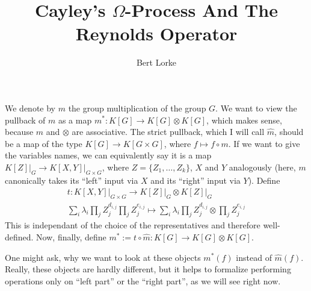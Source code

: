 \message{ !name(roughdraft.tex)}\documentclass{article}
\title{Cayley's $\Omega$-Process And The Reynolds Operator}
\author{Bert Lorke}
\theoremstyle{prrt}
\begin{document}
We denote by $m$ the group multiplication of the group $G$.
We want to view the pullback of $m$ as a map $m^\ast : K[G] \longrightarrow K[G] \otimes K[G]$, which makes sense, because $m$ and $\otimes$ are associative.
The strict pullback, which I will call $ \hat{m} $, should be a map of the type $ K[G] \longrightarrow K[ G \times G] $, where $ f \mapsto f \circ m $.
If we want to give the variables names, we can equivalently say it is a map $ \left. K[Z] \right|_G \longrightarrow \left. K[X,Y] \right|_{G \times G} $, where $ Z = \lbrace Z_1 , \ldots , Z_k \rbrace $, $X$ and $Y$ analogously (here, $ m $ canonically takes its ``left'' input via $ X $ and its ``right'' input via $ Y $). Define
\begin{equation}
  \begin{aligned}
   t : \left. K \left\lbrack X , Y \right\rbrack \right|_{G \times G} \longrightarrow \left. K \left\lbrack Z \right\rbrack \right|_G \otimes \left. K\left\lbrack Z \right\rbrack \right|_G \\
    \sum_i \lambda_i \prod_j Z_{j}^{d_{i,j}} \prod_j Z_{j}^{e_{i,j}} \mapsto \sum_i \lambda_i \prod_j Z_{j}^{d_{i,j}} \otimes \prod_j Z_{j}^{e_{i,j}} 
  \end{aligned}
\end{equation}
This is independant of the choice of the representatives and therefore well-defined.
Now, finally, define $m^\ast := t \circ \hat{m} : K[G] \longrightarrow K[G] \otimes K[G]$.

One might ask, why we want to look at these objects $ m^\ast \left( f \right) $ instead of $ \hat{m} \left( f \right) $.
Really, these objects are hardly different, but it helps to formalize performing operations only on ``left part'' or the ``right part'', as we will see right now.
\end{document}
